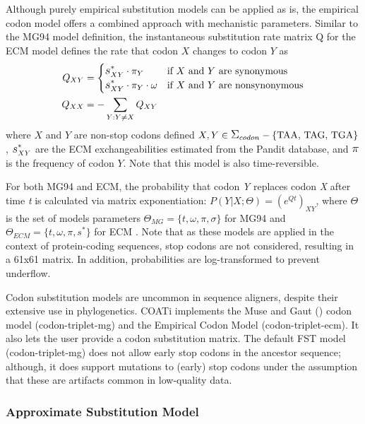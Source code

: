 Although purely empirical substitution models can be applied as is, the empirical codon model offers a combined approach with mechanistic parameters. Similar to the MG94 model definition, the instantaneous substitution rate matrix Q for the ECM model defines the rate that codon $X$ changes to codon $Y$ as
\begin{align}
Q_{XY} &=  \begin{cases}
    \grande{s}^*_{XY} \cdot \pi_Y & \text{if $X$ and $Y$ are synonymous}\\
    \grande{s}^*_{XY} \cdot \pi_Y \cdot \omega & \text{if $X$ and $Y$ are nonsynonymous}
\end{cases}\\
Q_{XX} &= -\sum_{Y:Y \neq X} Q_{XY}
\end{align}
where $X$ and $Y$ are non-stop codons defined $X, Y \in \grande{\Sigma}_{codon} - \{\text{TAA, TAG, TGA}\}$, $\grande{s}^*_{XY}$ are the ECM exchangeabilities estimated from the Pandit database, and $\grande{\pi}$ is the frequency of codon $Y$. Note that this model is also time-reversible.

For both MG94 and ECM, the probability that codon \textit{Y} replaces codon \textit{X} after time \textit{t} is calculated via matrix exponentiation: $P(Y|X; \Theta) = (e^{Qt})_{XY}$, where $\Theta$ is the set of models parameters $\Theta_{MG} = \{t, \omega, \pi, \sigma\}$ for MG94 and $\Theta_{ECM} = \{t, \omega, \pi, s^* \}$ for ECM \citep{holmes2002expectation}. Note that as these models are applied in the context of protein-coding sequences, stop codons are not considered, resulting in a 61x61 matrix. In addition, probabilities are log-transformed to prevent underflow.

Codon substitution models are uncommon in sequence aligners, despite their extensive use in phylogenetics.
COATi implements the Muse and Gaut (\citeyear{muse_gaut_1994}) codon model (codon-triplet-mg) and the Empirical Codon Model \citep{kosiol_ECM_2007} (codon-triplet-ecm).
It also lets the user provide a codon substitution matrix.
The default FST model (codon-triplet-mg) does not allow early stop codons in the ancestor sequence; although, it does support mutations to (early) stop codons under the assumption that these are artifacts common in low-quality data.

\subsubsection{Approximate Substitution Model}

